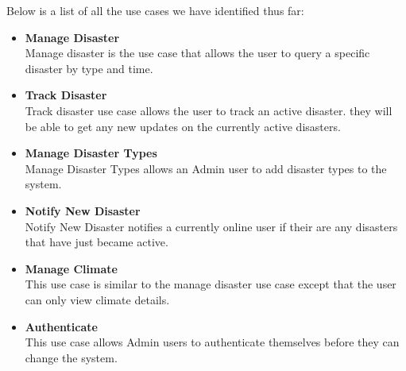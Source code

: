 Below is a list of all the use cases we have identified thus far:
\begin{itemize}%
	\item \textbf{Manage Disaster}\\ Manage disaster is the use case that allows the user to query a specific disaster by type and time.
	\item \textbf{Track Disaster} \\ Track disaster use case allows the user to track an active disaster. they will be able to get any new updates on the currently active disasters.
	\item \textbf{Manage Disaster Types} \\ Manage Disaster Types allows an Admin user to add disaster types to the system.
	\item \textbf{Notify New Disaster} \\ Notify New Disaster notifies a currently online user if their are any disasters that have just became active. 
	\item \textbf{Manage Climate} \\ This use case is similar to the manage disaster use case except that the user can only view climate details.
	\item \textbf{Authenticate} \\ This use case allows Admin users to authenticate themselves before they can change the system.
\end{itemize}